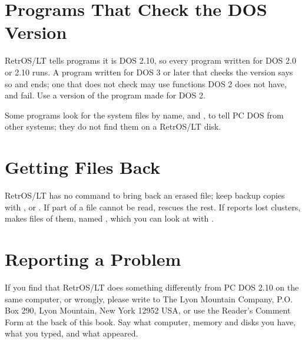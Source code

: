 \section{Programs That Check the DOS Version}

RetrOS/LT tells programs it is DOS 2.10, so every program written for DOS
2.0 or 2.10 runs. A program written for DOS 3 or later that checks the
version says so and ends; one that does not check may use functions DOS 2
does not have, and fail. Use a version of the program made for DOS 2.

Some programs look for the system files by name,  and
, to tell PC DOS from other systems; they do not find
them on a RetrOS/LT disk.

\section{Getting Files Back}

RetrOS/LT has no command to bring back an erased file; keep backup copies
with ,  or . If part of a file
cannot be read,  rescues the rest. If  reports
lost clusters,  makes files of them, named
, which you can look at with .

\section{Reporting a Problem}

If you find that RetrOS/LT does something differently from PC DOS 2.10 on
the same computer, or wrongly, please write to The Lyon Mountain Company,
P.O. Box 290, Lyon Mountain, New York 12952 USA, or use the Reader's
Comment Form at the back of this book. Say what computer, memory and disks
you have, what you typed, and what appeared.
